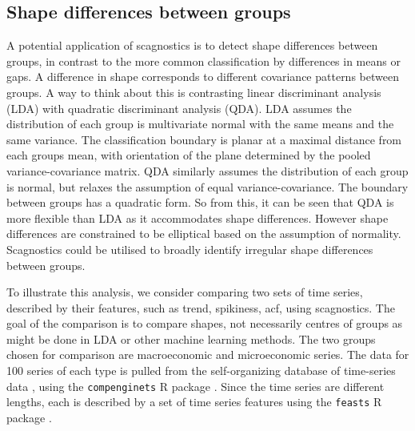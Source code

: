 \subsection{Shape differences between groups}\label{shape-differences-between-groups}

A potential application of scagnostics is to detect shape differences between groups, in contrast to the more common classification by differences in means or gaps. A difference in shape corresponds to different covariance patterns between groups. A way to think about this is contrasting linear discriminant analysis (LDA) with quadratic discriminant analysis (QDA). LDA assumes the distribution of each group is multivariate normal with the same means and the same variance. The classification boundary is planar at a maximal distance from each groups mean, with orientation of the plane determined by the pooled variance-covariance matrix. QDA similarly assumes the distribution of each group is normal, but relaxes the assumption of equal variance-covariance. The boundary between groups has a quadratic form. So from this, it can be seen that QDA is more flexible than LDA as it accommodates shape differences. However shape differences are constrained to be elliptical based on the assumption of normality. Scagnostics could be utilised to broadly identify irregular shape differences between groups.

To illustrate this analysis, we consider comparing two sets of time series, described by their features, such as trend, spikiness, acf, using scagnostics. The goal of the comparison is to compare shapes, not necessarily centres of groups as might be done in LDA or other machine learning methods. The two groups chosen for comparison are macroeconomic and microeconomic series. The data for 100 series of each type is pulled from the self-organizing database of time-series data \citep{sots}, using the \texttt{compenginets} R package \citep{compenginets}. Since the time series are different lengths, each is described by a set of time series features \citep[chapter 4 of][]{fpp} using the \texttt{feasts} R package \citep{feasts}.

